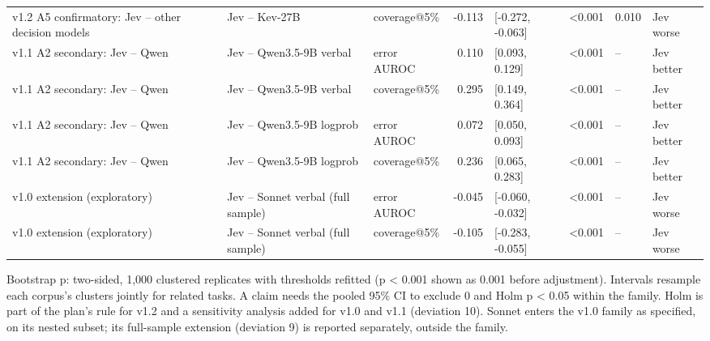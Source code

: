 \begin{table}[t]
\begin{adjustbox}{max width=\linewidth}
\begin{tabular}{lllrllll}
v1.2 A5 confirmatory: Jev -- other decision models & Jev -- Kev-27B & coverage@5\% & -0.113 & [-0.272, -0.063] & <0.001 & 0.010 & Jev worse \\
v1.1 A2 secondary: Jev -- Qwen & Jev -- Qwen3.5-9B verbal & error AUROC & 0.110 & [0.093, 0.129] & <0.001 & -- & Jev better \\
v1.1 A2 secondary: Jev -- Qwen & Jev -- Qwen3.5-9B verbal & coverage@5\% & 0.295 & [0.149, 0.364] & <0.001 & -- & Jev better \\
v1.1 A2 secondary: Jev -- Qwen & Jev -- Qwen3.5-9B logprob & error AUROC & 0.072 & [0.050, 0.093] & <0.001 & -- & Jev better \\
v1.1 A2 secondary: Jev -- Qwen & Jev -- Qwen3.5-9B logprob & coverage@5\% & 0.236 & [0.065, 0.283] & <0.001 & -- & Jev better \\
v1.0 extension (exploratory) & Jev -- Sonnet verbal (full sample) & error AUROC & -0.045 & [-0.060, -0.032] & <0.001 & -- & Jev worse \\
v1.0 extension (exploratory) & Jev -- Sonnet verbal (full sample) & coverage@5\% & -0.105 & [-0.283, -0.055] & <0.001 & -- & Jev worse \\
\bottomrule
\end{tabular}
\end{adjustbox}
\par\smallskip\footnotesize\raggedright Bootstrap p: two-sided, 1,000 clustered replicates with thresholds refitted (p < 0.001 shown as 0.001 before adjustment). Intervals resample each corpus's clusters jointly for related tasks. A claim needs the pooled 95\% CI to exclude 0 and Holm p < 0.05 within the family. Holm is part of the plan's rule for v1.2 and a sensitivity analysis added for v1.0 and v1.1 (deviation 10). Sonnet enters the v1.0 family as specified, on its nested subset; its full-sample extension (deviation 9) is reported separately, outside the family.
\end{table}
